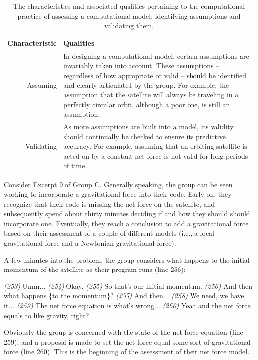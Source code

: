 \documentclass{msuphddissertation}
\begin{document}
\begin{doublespace}
\begin{table}
\begin{tabular}{r|p{}}
Characteristic & Qualities \\\hline\hline
Assuming & In designing a computational model, certain assumptions are invariably taken into account.  These assumptions -- regardless of how appropriate or valid -- should be identified and clearly articulated by the group.  For example, the assumption that the satellite will always be traveling in a perfectly circular orbit, although a poor one, is still an assumption.\\
Validating & As more assumptions are built into a model, its validity should continually be checked to ensure its predictive accuracy.  For example, assuming that an orbiting satellite is acted on by a constant net force is not valid for long periods of time.\\
\end{tabular}\caption{The characteristics and associated qualities pertaining to the computational practice of assessing a computational model: identifying assumptions and validating them.}\label{CH5:AssessingModels}
\end{table}

Consider Excerpt 9 of Group C.  Generally speaking, the group can be seen working to incorporate a gravitational force into their code.  Early on, they recognize that their code is missing the net force on the satellite, and subsequently spend about thirty minutes deciding if and how they should should incorporate one.  Eventually, they reach a conclusion to add a gravitational force based on their assessment of a couple of different models (i.e., a local gravitational force and a Newtonian gravitational force).

A few minutes into the problem, the group considers what happens to the initial momentum of the satellite as their program runs (line 256):
\begin{description}
\SA \textit{(253)} Umm...
\SB	\textit{(254)} Okay.
\SA \textit{(255)} So that's our initial momentum.			
\SA \textit{(256)} And then what happens \{to the momentum\}?
\SD \textit{(257)} And then...
\SA \textit{(258)} We need, we have it...		
\SA \textit{(259)} The net force equation is what's wrong...
\SD \textit{(260)} Yeah and the net force equals to like gravity, right?\end{description}  Obviously the group is concerned with the state of the net force equation (line 259), and a proposal is made to set the net force equal some sort of gravitational force (line 260).  This is the beginning of the assessment of their net force model.


\end{doublespace}
\end{document}
